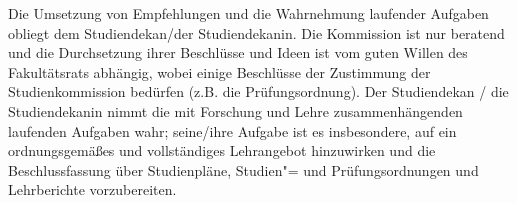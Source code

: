 Die Umsetzung von Empfehlungen und die Wahrnehmung laufender Aufgaben obliegt dem Studiendekan/der Studiendekanin. Die Kommission ist nur beratend und die Durchsetzung ihrer Beschlüsse und Ideen ist vom guten Willen des Fakultätsrats abhängig, wobei einige Beschlüsse der Zustimmung der Studienkommission bedürfen (z.B. die Prüfungsordnung). Der Studiendekan / die Studiendekanin nimmt die mit Forschung und Lehre zusammenhängenden laufenden Aufgaben wahr; seine/ihre Aufgabe ist es insbesondere, auf ein ordnungsgemäßes und vollständiges Lehrangebot hinzuwirken und die Beschlussfassung über Studienpläne, Studien"= und Prüfungsordnungen und Lehrberichte vorzubereiten.
